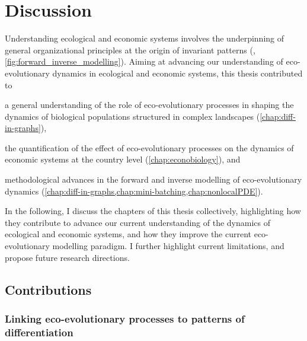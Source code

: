 
\graphicspath{{./content/conclusion/fig/}}

\chapter{Discussion}
\label{sec:conclusion}



Understanding ecological and economic systems involves the underpinning of general organizational principles at the origin of invariant patterns (\cite{Levin2002}, \cref{fig:forward_inverse_modelling}).
% 
Aiming at advancing our understanding of eco-evolutionary dynamics in ecological and economic systems, this thesis contributed to
% 
\begin{mylisti}
    \item a general understanding of the role of eco-evolutionary processes in shaping the dynamics of biological populations structured in complex landscapes (\cref{chap:diff-in-graphs}),
    \item the quantification of the effect of eco-evolutionary processes on the dynamics of economic systems at the country level (\cref{chap:econobiology}), and
    \item methodological advances in the forward and inverse modelling of eco-evolutionary dynamics (\cref{chap:diff-in-graphs,chap:mini-batching,chap:nonlocalPDE}).
\end{mylisti}
% 
In the following, I discuss the chapters of this thesis collectively, highlighting how they contribute to advance our current understanding of the dynamics of ecological and economic systems, and how they improve the current eco-evolutionary modelling paradigm. I further highlight current limitations, and propose future research directions.

\section{Contributions}

\subsection{Linking eco-evolutionary processes to patterns of differentiation}

